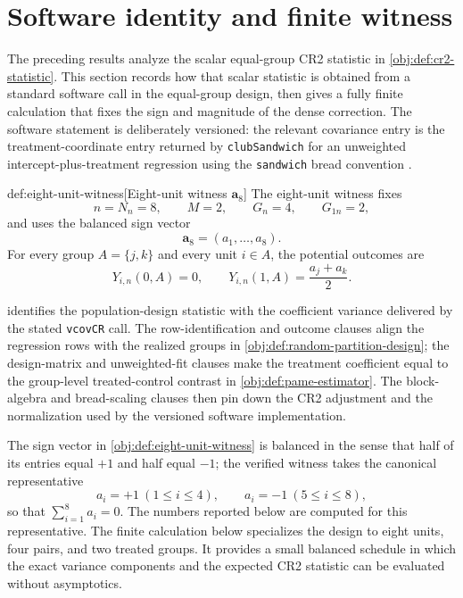 \section{Software identity and finite witness}\label{sec:software-witness}

The preceding results analyze the scalar equal-group CR2 statistic in \cref{obj:def:cr2-statistic}. This section records how that scalar statistic is obtained from a standard software call in the equal-group design, then gives a fully finite calculation that fixes the sign and magnitude of the dense correction. The software statement is deliberately versioned: the relevant covariance entry is the treatment-coordinate entry returned by \texttt{clubSandwich} for an unweighted intercept-plus-treatment regression using the \texttt{sandwich} bread convention \citep{ClubSandwich2026,Sandwich2026,Zeileis2004,Zeileis2006,ZeileisKollGraham2020,PustejovskyTipton2018}.

\begin{definitionv}{def:eight-unit-witness}[Eight-unit witness $\mathbf a_8$]
The eight-unit witness fixes
\[
n=N_n=8,\qquad
M=2,\qquad
G_n=4,\qquad
G_{1n}=2,
\]
and uses the balanced sign vector
\[
\mathbf a_8=(a_1,\ldots,a_8).
\]
For every group \(A=\{j,k\}\) and every unit \(i\in A\), the potential outcomes are
\[
Y_{i,n}(0,A)=0,
\qquad
Y_{i,n}(1,A)=\frac{a_j+a_k}{2}.
\]
\end{definitionv}

 identifies the population-design statistic with the coefficient variance delivered by the stated \texttt{vcovCR} call. The row-identification and outcome clauses align the regression rows with the realized groups in \cref{obj:def:random-partition-design}; the design-matrix and unweighted-fit clauses make the treatment coefficient equal to the group-level treated-control contrast in \cref{obj:def:pame-estimator}. The block-algebra and bread-scaling clauses then pin down the CR2 adjustment and the normalization used by the versioned software implementation.

The sign vector in \cref{obj:def:eight-unit-witness} is balanced in the sense that half of its entries equal \(+1\) and half equal \(-1\); the verified witness takes the canonical representative
\[
a_i=+1\ (1\le i\le 4),
\qquad
a_i=-1\ (5\le i\le 8),
\]
so that \(\sum_{i=1}^{8}a_i=0\). The numbers reported below are computed for this representative. The finite calculation below specializes the design to eight units, four pairs, and two treated groups. It provides a small balanced schedule in which the exact variance components and the expected CR2 statistic can be evaluated without asymptotics.

